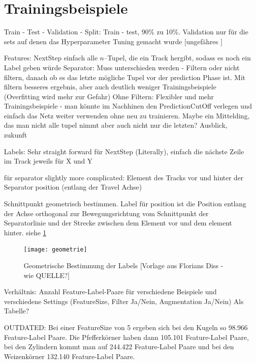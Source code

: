 \color{black}
\section{Trainingsbeispiele}

Train - Test - Validation - Split:
Train - test, 90\% zu 10\%.
Validation nur für die sets auf denen das Hyperparameter Tuning gemacht wurde
[ungefähres ]


Features:
NextStep einfach alle \(n\)--Tupel, die ein Track hergibt, sodass es noch ein Label geben würde
Separator: Muss unterschieden werden - Filtern oder nicht filtern, danach ob es das letzte mögliche Tupel vor der prediction Phase ist.
Mit filtern besseres ergebnis, aber auch deutlich weniger Trainingsbeispiele (Overfitting wird mehr zur Gefahr)
Ohne Filtern: Flexibler und mehr Trainingsbeispiele - man könnte im Nachhinen den PredictionCutOff verlegen 
und einfach das Netz weiter verwenden ohne neu zu trainieren.
Maybe ein Mittelding, das man nicht alle tupel nimmt aber auch nicht nur die letzten? Ausblick, zukunft


Labels:
Sehr straight forward für NextStep (Literally), einfach die nächste Zeile im Track jeweils für X und Y

für separator slightly more complicated: 
Element des Tracks vor und hinter der Separator position (entlang der Travel Achse)

Schnittpunkt geometrisch bestimmen.
Label für position ist die Position entlang der Achse orthogonal zur Bewegungsrichtung vom Schnittpunkt der Separatorlinie und 
der Strecke zwischen dem Element vor und dem element hinter. siehe \ref{fig:Schnittpunkt}


\begin{figure}
	\centering
	\texttt{[image: geometrie]}
	\caption{Geometrische Bestimmung der Labels [Vorlage aus Florians Diss - wie QUELLE?]}
	\label{fig:Schnittpunkt}
\end{figure}


Verhältnis: Anzahl Feature-Label-Paare für verschiedene Beispiele und verschiedene Settings
(FeatureSize, Filter Ja/Nein, Augmentation Ja/Nein) Als Tabelle?

OUTDATED:
Bei einer FeatureSize von 5 ergeben sich bei den Kugeln so 98.966 Feature-Label Paare.
Die Pfefferkörner haben dann 105.101 Feature-Label Paare,
bei den Zylindern kommt man auf 244.422 Feature-Label Paare
und bei den Weizenkörner 132.140 Feature-Label Paare.
